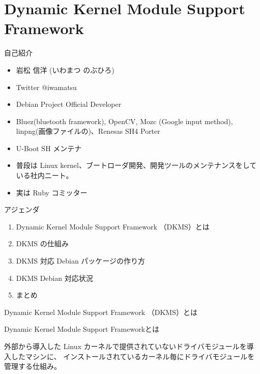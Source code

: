 
\section{Dynamic Kernel Module Support Framework}

\begin{frame}{自己紹介}

\begin{itemize}
\item 岩松 信洋 (いわまつ のぶひろ)
\item Twitter @iwamatsu
\item Debian Project Official Developer
\item Bluez(bluetooth framework), OpenCV, Mozc (Google input method), linpng(画像ファイルの)、Renesas SH4 Porter
\item U-Boot SH メンテナ
\item 普段は Linux kernel、ブートローダ開発、開発ツールのメンテナンスをしている社内ニート。
\item 実は Ruby コミッター
\end{itemize}

\end{frame}



\begin{frame}{アジェンダ}

\begin{enumerate}
\item Dynamic Kernel Module Support Framework （DKMS）とは
\item DKMS の仕組み
\item DKMS 対応 Debian パッケージの作り方
\item DKMS Debian 対応状況
\item まとめ
\end{enumerate}
\end{frame}

\begin{frame}
\large\bfseries
\begin{center}
Dynamic Kernel Module Support Framework （DKMS）とは
\end{center}
\end{frame}

\begin{frame}{Dynamic Kernel Module Support Frameworkとは}

外部から導入した
Linux カーネルで提供されていないドライバモジュールを導入したマシンに、
インストールされているカーネル毎にドライバモジュールを管理する仕組み。

\end{frame}

